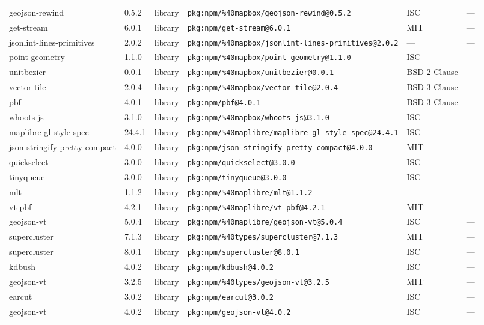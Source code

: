 \documentclass[11pt]{article}
\begin{document}
\begin{longtable}{|l|l|l|p{2.2cm}|l|p{4cm}|}
geojson-rewind & 0.5.2 & library & \texttt{pkg:npm/\%40mapbox/geojson-rewind@0.5.2} & ISC & — \\
get-stream & 6.0.1 & library & \texttt{pkg:npm/get-stream@6.0.1} & MIT & — \\
jsonlint-lines-primitives & 2.0.2 & library & \texttt{pkg:npm/\%40mapbox/jsonlint-lines-primitives@2.0.2} & — & — \\
point-geometry & 1.1.0 & library & \texttt{pkg:npm/\%40mapbox/point-geometry@1.1.0} & ISC & — \\
unitbezier & 0.0.1 & library & \texttt{pkg:npm/\%40mapbox/unitbezier@0.0.1} & BSD-2-Clause & — \\
vector-tile & 2.0.4 & library & \texttt{pkg:npm/\%40mapbox/vector-tile@2.0.4} & BSD-3-Clause & — \\
pbf & 4.0.1 & library & \texttt{pkg:npm/pbf@4.0.1} & BSD-3-Clause & — \\
whoots-js & 3.1.0 & library & \texttt{pkg:npm/\%40mapbox/whoots-js@3.1.0} & ISC & — \\
maplibre-gl-style-spec & 24.4.1 & library & \texttt{pkg:npm/\%40maplibre/maplibre-gl-style-spec@24.4.1} & ISC & — \\
json-stringify-pretty-compact & 4.0.0 & library & \texttt{pkg:npm/json-stringify-pretty-compact@4.0.0} & MIT & — \\
quickselect & 3.0.0 & library & \texttt{pkg:npm/quickselect@3.0.0} & ISC & — \\
tinyqueue & 3.0.0 & library & \texttt{pkg:npm/tinyqueue@3.0.0} & ISC & — \\
mlt & 1.1.2 & library & \texttt{pkg:npm/\%40maplibre/mlt@1.1.2} & — & — \\
vt-pbf & 4.2.1 & library & \texttt{pkg:npm/\%40maplibre/vt-pbf@4.2.1} & MIT & — \\
geojson-vt & 5.0.4 & library & \texttt{pkg:npm/\%40maplibre/geojson-vt@5.0.4} & ISC & — \\
supercluster & 7.1.3 & library & \texttt{pkg:npm/\%40types/supercluster@7.1.3} & MIT & — \\
supercluster & 8.0.1 & library & \texttt{pkg:npm/supercluster@8.0.1} & ISC & — \\
kdbush & 4.0.2 & library & \texttt{pkg:npm/kdbush@4.0.2} & ISC & — \\
geojson-vt & 3.2.5 & library & \texttt{pkg:npm/\%40types/geojson-vt@3.2.5} & MIT & — \\
earcut & 3.0.2 & library & \texttt{pkg:npm/earcut@3.0.2} & ISC & — \\
geojson-vt & 4.0.2 & library & \texttt{pkg:npm/geojson-vt@4.0.2} & ISC & — \\

\end{longtable}
\end{document}
